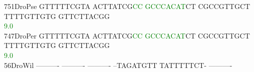 \documentclass[11pt,twoside,reqno,a4paper]{article}
\begin{document}
{751\hspace*{2\charwidth}DroPse	GTTTTTCGTA	ACTTATCG\textcolor{Green}{C}\textcolor{Green}{C}	\textcolor{Green}{G}\textcolor{Green}{C}\textcolor{Green}{C}\textcolor{Green}{C}\textcolor{Green}{A}\textcolor{Green}{C}\textcolor{Green}{A}\textcolor{Green}{T}CT	CGCCGTTGCT	TTTTGTTGTG	GTTCTTACGG	\\
\hspace*{5\charwidth}\hspace*{7\charwidth}\hspace*{1\charwidth}\hspace*{18\charwidth}\textcolor{Green}{9.0}\hspace*{1\charwidth}\hspace*{1\charwidth}\hspace*{1\charwidth}\hspace*{1\charwidth}\hspace*{1\charwidth}\\
747\hspace*{2\charwidth}DroPer	GTTTTTCGTA	ACTTATCG\textcolor{Green}{C}\textcolor{Green}{C}	\textcolor{Green}{G}\textcolor{Green}{C}\textcolor{Green}{C}\textcolor{Green}{C}\textcolor{Green}{A}\textcolor{Green}{C}\textcolor{Green}{A}\textcolor{Green}{T}CT	CGCCGTTGCT	TTTTGTTGTG	GTTCTTACGG	\\
\hspace*{5\charwidth}\hspace*{7\charwidth}\hspace*{1\charwidth}\hspace*{18\charwidth}\textcolor{Green}{9.0}\hspace*{1\charwidth}\hspace*{1\charwidth}\hspace*{1\charwidth}\hspace*{1\charwidth}\hspace*{1\charwidth}\\
56\hspace*{3\charwidth}DroWil	----------	----------	----------	--TAGATGTT	TATTTTTCT-	----------	\\
\hspace*{5\charwidth}\hspace*{7\charwidth}\hspace*{1\charwidth}\hspace*{1\charwidth}\hspace*{1\charwidth}\hspace*{1\charwidth}\hspace*{1\charwidth}\hspace*{1\charwidth}\\
}
\end{document}
